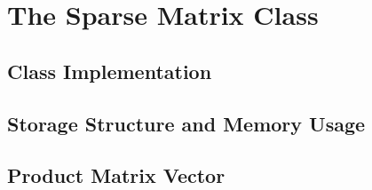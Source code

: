 \section{The Sparse Matrix Class}\label{sec:sparsematrix}

\subsection{Class Implementation} \label{sec:sparsematrix_implementation}

\subsection{Storage Structure and Memory Usage} \label{sec:storage}

\subsection{Product Matrix Vector} \label{sec:product}